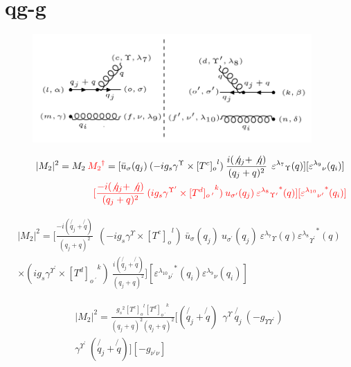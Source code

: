\pagebreak

\section{qg-g}
\begin{figure}[ht!]
\centering
\includegraphics[width=0.95\textwidth]{images/qggM2squer.png}
\end{figure}
\begin{equation}
\begin{split}
|M_2|^2=M_2\:{\color[RGB]{255,0,0} {M_2}^{\dagger}} = [{\bar{u}}_{\sigma}(q_j)\: (-ig_s \gamma^{\Upsilon}\times {[T^c]_o}^l) \: \frac{i(\not{q_j} + \not{q})}{(q_j + q)^2}\:\: {\varepsilon^{\lambda_7}}_{\Upsilon} (q)] [{\varepsilon^{\lambda_9}}_{\nu} (q_i)]\: \\
\quad\quad\quad\quad\quad\quad\quad\quad\:\:{\color[RGB]{255,0,0}[\frac{-i(\not{q_j} + \not{q})}{(q_j + q)^2} \:  (ig_s \gamma^{{\Upsilon}^{\prime}}\times {[T^d]_{o\:^{\prime}}}^k) \: u_{{\sigma}^{\prime}}(q_j) \: {{\varepsilon^{\lambda_8}}_{{\Upsilon}^{\prime}}}^* (q)][{{\varepsilon^{\lambda_{10}}}_{{\nu}^{\prime}}}^* (q_i)]}
\end{split}
\end{equation}

\begin{equation}
\begin{split}
|M_2|^2=[\frac{-i(\not{q_j} + \not{q})}{(q_j + q)^2} \:
 \:  (-ig_s \gamma^{\Upsilon}\times {[T^c]_o}^l) \: {\bar{u}}_{\sigma}(q_j)\:u_{{\sigma}^{\prime}}(q_j) \: {\varepsilon^{\lambda_7}}_{\Upsilon} (q) {{\varepsilon^{\lambda_8}}_{{\Upsilon}^{\prime}}}^* (q) \\
\times (ig_s \gamma^{{\Upsilon}^{\prime}}\times {[T^d]_{o\:^{\prime}}}^k) \: \frac{i(\not{q_j} + \not{q})}{(q_j + q)^2} ]
[{{\varepsilon^{\lambda_{10}}}_{{\nu}^{\prime}}}^* (q_i) {\varepsilon^{\lambda_9}}_{\nu} (q_i)]
\end{split}
\end{equation}

\begin{equation}
\begin{split}
|M_2|^2=\frac{{g_s}^2 {[T^c]_o}^l {[T^d]_{o\:^{\prime}}}^k}{(q_j + q)^2 (q_j + q)^2}
[(\not{q_j} + \not{q}) \:
 \:  \gamma^{\Upsilon} \: \not{q_j} \: (-g_{{\Upsilon}{{\Upsilon}^{\prime}}}) \\
\gamma^{{\Upsilon}^{\prime}} \: (\not{q_j} + \not{q})]
[-g_{{\nu}^{\prime}{\nu}}]
\end{split}
\end{equation}

